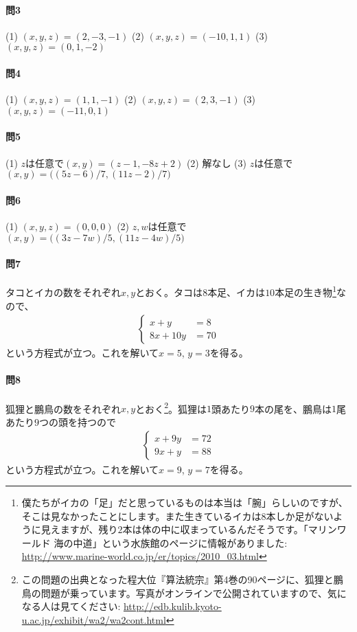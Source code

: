 \paragraph{問3}
(1) $(x, y, z) = (2, -3, -1)$ \quad (2) $(x, y, z) = (-10, 1, 1)$ \quad (3) $(x, y, z) = (0, 1, -2)$ 

\paragraph{問4}
(1) $(x, y, z) = (1, 1, -1)$ \quad (2) $(x, y, z) = (2, 3, -1)$ \quad (3) $(x, y, z) = (-11, 0, 1)$

\paragraph{問5}
(1) $z$は任意で$(x, y) = (z - 1, -8z + 2)$ \quad (2) 解なし \quad (3) $z$は任意で$(x, y) = \bigl((5z - 6)/7, (11z - 2)/7 \bigr)$

\paragraph{問6}
(1) $(x, y, z) = (0, 0, 0)$ \quad (2) $z, w$は任意で$(x, y) = \bigl((3z - 7w)/ 5, (11z - 4w)/5 \bigr)$

\paragraph{問7} タコとイカの数をそれぞれ$x, y$とおく。タコは$8$本足、イカは$10$本足の生き物\footnote{僕たちがイカの「足」だと思っているものは本当は「腕」らしいのですが、そこは見なかったことにします。また生きているイカは$8$本しか足がないように見えますが、残り$2$本は体の中に収まっているんだそうです。「マリンワールド 海の中道」という水族館のページに情報がありました: \url{http://www.marine-world.co.jp/er/topics/2010_03.html}}なので、
\begin{align*}
\begin{cases}
x + y &= 8 \\
8x + 10y &= 70
\end{cases}
\end{align*}
という方程式が立つ。これを解いて$x = 5$, $y = 3$を得る。

\paragraph{問8} 狐狸と鵬鳥の数をそれぞれ$x, y$とおく\footnote{この問題の出典となった程大位『算法統宗』第4巻の90ページに、狐狸と鵬鳥の問題が乗っています。写真がオンラインで公開されていますので、気になる人は見てください: \url{http://edb.kulib.kyoto-u.ac.jp/exhibit/wa2/wa2cont.html} }。狐狸は$1$頭あたり$9$本の尾を、鵬鳥は$1$尾あたり$9$つの頭を持つので
\begin{align*}
\begin{cases}
x + 9y &= 72 \\
9x + y &= 88
\end{cases}
\end{align*}
という方程式が立つ。これを解いて$x = 9$, $y = 7$を得る。

